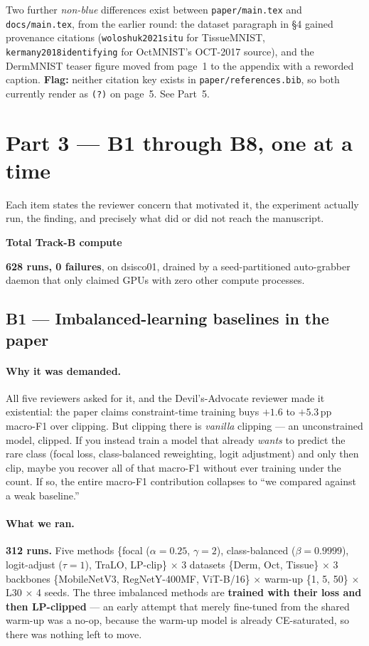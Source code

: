 \documentclass[11pt,a4paper]{article}
\newcommand{\yes}{\textcolor{okgreen}{\textbf{in the paper}}}
\newenvironment{callout}[1]
  {\par\medskip\noindent\begin{lrbox}{\calloutbox}%
   \begin{minipage}{\dimexpr\linewidth-20pt\relax}%
   \textbf{#1}\par\smallskip}
  {\end{minipage}\end{lrbox}%
   \setlength{\fboxsep}{10pt}%
   \colorbox{boxgrey}{\usebox{\calloutbox}}\par\medskip}
\begin{document}
Two further \emph{non-blue} differences exist between \texttt{paper/main.tex} and
\texttt{docs/main.tex}, from the earlier round: the dataset paragraph in \S4 gained provenance
citations (\texttt{woloshuk2021situ} for TissueMNIST, \texttt{kermany2018identifying} for
OctMNIST's OCT-2017 source), and the DermMNIST teaser figure moved from page~1 to the appendix with
a reworded caption. \textcolor{warnred}{\textbf{Flag:} neither citation key exists in
\texttt{paper/references.bib}, so both currently render as \texttt{(?)} on page~5.} See Part~5.

\section*{Part 3 --- B1 through B8, one at a time}

Each item states the reviewer concern that motivated it, the experiment actually run, the finding,
and precisely what did or did not reach the manuscript.

\begin{callout}{Total Track-B compute}
\textbf{628 runs, 0 failures}, on dsisco01, drained by a seed-partitioned auto-grabber daemon that
only claimed GPUs with zero other compute processes.
\end{callout}

\subsection*{B1 --- Imbalanced-learning baselines \hfill\normalsize\yes}

\paragraph{Why it was demanded.} All five reviewers asked for it, and the Devil's-Advocate reviewer
made it existential: the paper claims constraint-time training buys $+1.6$ to $+5.3$\,pp macro-F1
over clipping. But clipping there is \emph{vanilla} clipping --- an unconstrained model, clipped. If
you instead train a model that already \emph{wants} to predict the rare class (focal loss,
class-balanced reweighting, logit adjustment) and only then clip, maybe you recover all of that
macro-F1 without ever training under the count. If so, the entire macro-F1 contribution collapses to
``we compared against a weak baseline.''

\paragraph{What we ran.} \textbf{312 runs.} Five methods \{focal ($\alpha{=}0.25$, $\gamma{=}2$),
class-balanced ($\beta{=}0.9999$), logit-adjust ($\tau{=}1$), TraLO, LP-clip\} $\times$ 3 datasets
\{Derm, Oct, Tissue\} $\times$ 3 backbones \{MobileNetV3, RegNetY-400MF, ViT-B/16\} $\times$
warm-up \{1, 5, 50\} $\times$ L30 $\times$ 4 seeds. The three imbalanced methods are \textbf{trained
with their loss and then LP-clipped} --- an early attempt that merely fine-tuned from the shared
warm-up was a no-op, because the warm-up model is already CE-saturated, so there was nothing left to
move.
\end{document}
